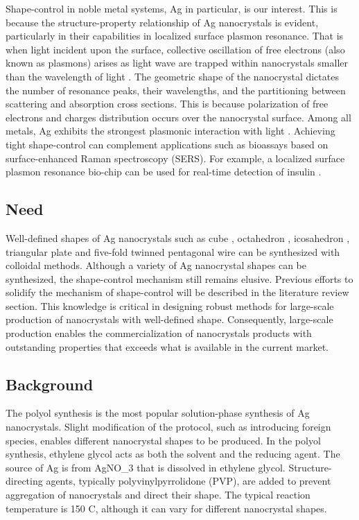 Shape-control in noble metal systems, Ag in particular, is our interest.
This is because the structure-property relationship of Ag nanocrystals is evident, particularly in their capabilities in localized surface plasmon resonance.
That is when light incident upon the surface, collective oscillation of free electrons (also known as plasmons) arises as light wave are trapped within nanocrystals smaller than the wavelength of light \cite{Petryayeva_2011}.
The geometric shape of the nanocrystal dictates the number of resonance peaks, their wavelengths, and the partitioning between scattering and absorption cross sections.
This is because polarization of free electrons and charges distribution occurs over the nanocrystal surface.
Among all metals, Ag exhibits the strongest plasmonic interaction with light \cite{Lu_2009}.
Achieving tight shape-control can complement applications such as bioassays based on surface-enhanced Raman spectroscopy (SERS).
For example, a localized surface plasmon resonance bio-chip can be used for real-time detection of insulin \cite{Hiep_2008}.

\subsection{Need}

Well-defined shapes of Ag nanocrystals such as cube \cite{Im_2005}, octahedron \cite{Xia_2012}, icosahedron \cite{Xiong_2007}, triangular plate \cite{Lofton_2005} and five-fold twinned pentagonal wire \cite{Tsuji_2008} can be synthesized with colloidal methods.
Although a variety of Ag nanocrystal shapes can be synthesized, the shape-control mechanism still remains elusive.
Previous efforts to solidify the mechanism of shape-control will be described in the literature review section.
This knowledge is critical in designing robust methods for large-scale production of nanocrystals with well-defined shape.
Consequently, large-scale production enables the commercialization of nanocrystals products with outstanding properties that exceeds what is available in the current market.

\subsection{Background}

The polyol synthesis is the most popular solution-phase synthesis of Ag nanocrystals. 
Slight modification of the protocol, such as introducing foreign species, enables different nanocrystal shapes to be produced.
In the polyol synthesis, ethylene glycol acts as both the solvent and the reducing agent.
The source of Ag is from AgNO_3 that is dissolved in ethylene glycol.
Structure-directing agents, typically polyvinylpyrrolidone (PVP), are added to prevent aggregation of nanocrystals and direct their shape.
The typical reaction temperature is 150 \degree C, although it can vary for different nanocrystal shapes.


